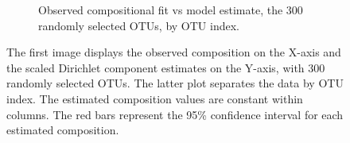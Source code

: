 \documentclass{template}
\begin{document}
\begin{figure}[ht!]
\begin{subfigure}[b]{0.36\textheight}
        \caption{Observed compositional fit vs model estimate, the 300 randomly selected OTUs, by OTU index.}
    \end{subfigure}
    \caption{The first image displays the observed composition on the X-axis and the scaled Dirichlet component estimates on the Y-axis, with 300 randomly selected OTUs. The latter plot separates the data by OTU index. The estimated composition values are constant within columns. The red bars represent the 95\% confidence interval for each estimated composition.}\label{fig:dmmFitBar300}
\end{figure}

\FloatBarrier
\clearpage 



\end{document}
